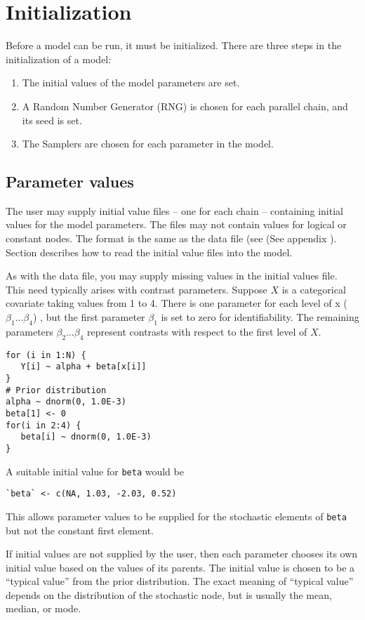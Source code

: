 \documentclass[11pt, a4paper, titlepage]{report}
\begin{document}
\section{Initialization}

Before a model can be run, it must be initialized. There are three
steps in the initialization of a model:
\begin{enumerate}
\item The initial values of the model parameters are set.
\item A Random Number Generator (RNG) is chosen for each parallel chain,
  and its seed is set.
\item The Samplers are chosen for each parameter in the model. 
\end{enumerate}

\subsection{Parameter values}

The user may supply initial value files -- one for each chain --
containing initial values for the model parameters. The files may not
contain values for logical or constant nodes. The format is the same
as the data file (see (See appendix \cite{appendix:data}).
Section \label{parameters:in} describes how to read the initial value
files into the model.

As with the data file, you may supply missing values in the initial
values file.  This need typically arises with contrast parameters.
Suppose $X$ is a categorical covariate taking values from 1 to
4. There is one parameter for each level of x ($\beta_1 \ldots
\beta_4$) , but the first parameter $\beta_1$ is set to zero for
identifiability. The remaining parameters $\beta_2 \ldots \beta_4$
represent contrasts with respect to the first level of $X$.
\begin{verbatim}
for (i in 1:N) {
   Y[i] ~ alpha + beta[x[i]]
}
# Prior distribution
alpha ~ dnorm(0, 1.0E-3)
beta[1] <- 0
for(i in 2:4) {
   beta[i] ~ dnorm(0, 1.0E-3)
}
\end{verbatim}
A suitable initial value for \verb+beta+ would be
\begin{verbatim}
`beta` <- c(NA, 1.03, -2.03, 0.52)
\end{verbatim}
This allows parameter values to be supplied for the stochastic
elements of \verb+beta+ but not the constant first element.

If initial values are not supplied by the user, then each parameter
chooses its own initial value based on the values of its parents.  The
initial value is chosen to be a ``typical value'' from the prior
distribution. The exact meaning of ``typical value'' depends on the
distribution of the stochastic node, but is usually the mean, median,
or mode.
\end{document}
